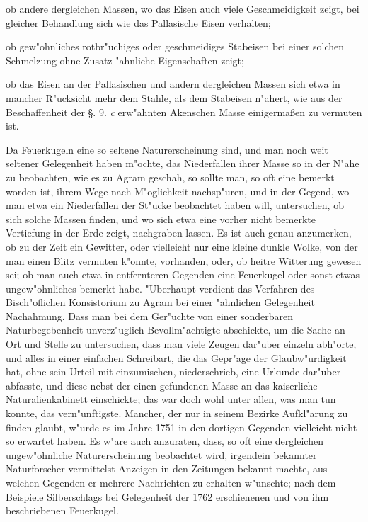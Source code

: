 \documentclass[a4paper, 11pt, oneside, polutonikogreek, german]{article}
\begin{document}
ob andere dergleichen Massen, wo das Eisen auch viele Geschmeidigkeit zeigt, bei gleicher Behandlung sich wie das Pallasische Eisen verhalten;

ob gew"ohnliches rotbr"uchiges oder geschmeidiges Stabeisen bei einer solchen Schmelzung ohne Zusatz "ahnliche Eigenschaften zeigt;

ob das Eisen an der Pallasischen und andern dergleichen Massen sich etwa in mancher R"ucksicht mehr dem Stahle, als dem Stabeisen n"ahert, wie aus der Beschaffenheit der §. 9. \emph{c} erw"ahnten Akenschen Masse einigermaßen zu vermuten ist.

Da Feuerkugeln eine so seltene Naturerscheinung sind, und man noch weit seltener Gelegenheit haben m"ochte, das Niederfallen ihrer Masse so in der N"ahe zu beobachten, wie es zu Agram geschah, so sollte man, so oft eine bemerkt worden ist, ihrem Wege nach M"oglichkeit nachsp"uren, und in der Gegend, wo man etwa ein Niederfallen der St"ucke beobachtet haben will, untersuchen, ob sich solche Massen finden, und wo sich etwa eine vorher nicht bemerkte Vertiefung in der Erde zeigt, nachgraben lassen. Es ist auch genau anzumerken, ob zu der Zeit ein Gewitter, oder vielleicht nur eine kleine dunkle Wolke, von der man einen Blitz vermuten k"onnte, vorhanden, oder, ob heitre Witterung gewesen sei; ob man auch etwa in entfernteren Gegenden eine Feuerkugel oder sonst etwas ungew"ohnliches bemerkt habe. "Uberhaupt verdient das Verfahren des Bisch"oflichen Konsistorium zu Agram bei einer "ahnlichen Gelegenheit Nachahmung. Dass man bei dem Ger"uchte von einer sonderbaren Naturbegebenheit unverz"uglich Bevollm"achtigte abschickte, um die Sache an Ort und Stelle zu untersuchen, dass man viele Zeugen dar"uber einzeln abh"orte, und alles in einer einfachen Schreibart, die das Gepr"age der Glaubw"urdigkeit hat, ohne sein Urteil mit einzumischen, niederschrieb, eine Urkunde dar"uber abfasste, und diese nebst der einen gefundenen Masse an das kaiserliche Naturalienkabinett einschickte; das war doch wohl unter allen, was man tun konnte, das vern"unftigste. Mancher, der nur in seinem Bezirke Aufkl"arung zu finden glaubt, w"urde es im Jahre 1751 in den dortigen Gegenden vielleicht nicht so erwartet haben. Es w"are auch anzuraten, dass, so oft eine dergleichen ungew"ohnliche Naturerscheinung beobachtet wird, irgendein bekannter Naturforscher vermittelst Anzeigen in den Zeitungen bekannt machte, aus welchen Gegenden er mehrere Nachrichten zu erhalten w"unschte; nach dem Beispiele Silberschlags bei Gelegenheit der 1762 erschienenen und von ihm beschriebenen Feuerkugel.
\end{document}
